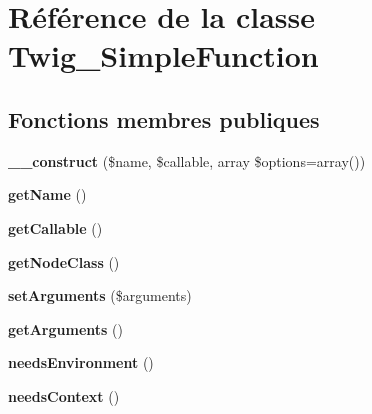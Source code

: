 \hypertarget{class_twig___simple_function}{}\section{Référence de la classe Twig\+\_\+\+Simple\+Function}
\label{class_twig___simple_function}
\subsection*{Fonctions membres publiques}
\begin{DoxyCompactItemize}
\item 
{\bfseries \+\_\+\+\_\+construct} (\$name, \$callable, array \$options=array())\hypertarget{class_twig___simple_function_a1e24fc85f3981c10f1e71d93a4f54144}{}\label{class_twig___simple_function_a1e24fc85f3981c10f1e71d93a4f54144}

\item 
{\bfseries get\+Name} ()\hypertarget{class_twig___simple_function_a3d0963e68bb313b163a73f2803c64600}{}\label{class_twig___simple_function_a3d0963e68bb313b163a73f2803c64600}

\item 
{\bfseries get\+Callable} ()\hypertarget{class_twig___simple_function_a0be839e0782a38a172c386bd963375c9}{}\label{class_twig___simple_function_a0be839e0782a38a172c386bd963375c9}

\item 
{\bfseries get\+Node\+Class} ()\hypertarget{class_twig___simple_function_a8d85021f1f19e71dd99d7dfdd138c927}{}\label{class_twig___simple_function_a8d85021f1f19e71dd99d7dfdd138c927}

\item 
{\bfseries set\+Arguments} (\$arguments)\hypertarget{class_twig___simple_function_a2b7df0e0f61ee886144db2d59fc0d7da}{}\label{class_twig___simple_function_a2b7df0e0f61ee886144db2d59fc0d7da}

\item 
{\bfseries get\+Arguments} ()\hypertarget{class_twig___simple_function_a1d4c324c5a088be98d99d3efbf3502e1}{}\label{class_twig___simple_function_a1d4c324c5a088be98d99d3efbf3502e1}

\item 
{\bfseries needs\+Environment} ()\hypertarget{class_twig___simple_function_a711311882c7dd1058f92f7eb0e8edeeb}{}\label{class_twig___simple_function_a711311882c7dd1058f92f7eb0e8edeeb}

\item 
{\bfseries needs\+Context} ()\hypertarget{class_twig___simple_function_a52c35bc6da8861f40aa59f1b99f7ef0f}{}\label{class_twig___simple_function_a52c35bc6da8861f40aa59f1b99f7ef0f}


\end{DoxyCompactItemize}
